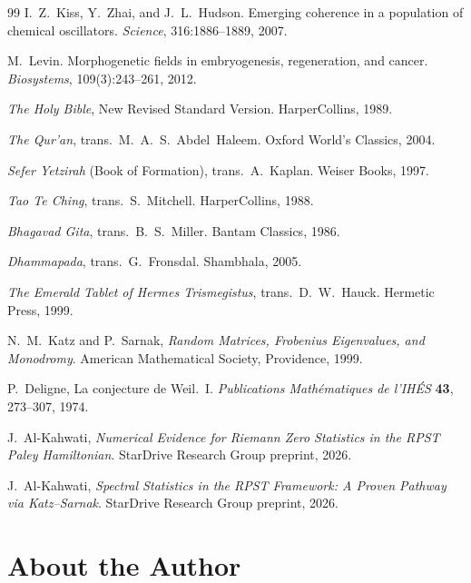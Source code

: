 \documentclass[12pt,oneside]{book}
\theoremstyle{definition}
\begin{document}
\begin{thebibliography}{99}
  I.~Z.~Kiss, Y.~Zhai, and J.~L.~Hudson. Emerging coherence in a population of
  chemical oscillators. \textit{Science}, 316:1886--1889, 2007.

  M.~Levin. Morphogenetic fields in embryogenesis, regeneration, and cancer.
  \textit{Biosystems}, 109(3):243--261, 2012.

  \textit{The Holy Bible}, New Revised Standard Version. HarperCollins, 1989.

  \textit{The Qur'an}, trans.\ M.~A.~S.~Abdel~Haleem. Oxford World's Classics, 2004.

  \textit{Sefer Yetzirah} (Book of Formation), trans.\ A.~Kaplan.
  Weiser Books, 1997.

  \textit{Tao Te Ching}, trans.\ S.~Mitchell. HarperCollins, 1988.

  \textit{Bhagavad Gita}, trans.\ B.~S.~Miller. Bantam Classics, 1986.

  \textit{Dhammapada}, trans.\ G.~Fronsdal. Shambhala, 2005.

  \textit{The Emerald Tablet of Hermes Trismegistus}, trans.\ D.~W.~Hauck.
  Hermetic Press, 1999.

  N.~M.~Katz and P.~Sarnak,
  \textit{Random Matrices, Frobenius Eigenvalues, and Monodromy}.
  American Mathematical Society, Providence, 1999.

  P.~Deligne,
  La conjecture de Weil.~I.
  \textit{Publications Mathématiques de l'IHÉS} \textbf{43}, 273--307, 1974.

  J.~Al-Kahwati,
  \textit{Numerical Evidence for Riemann Zero Statistics in the RPST Paley
  Hamiltonian}.
  StarDrive Research Group preprint, 2026.

  J.~Al-Kahwati,
  \textit{Spectral Statistics in the RPST Framework: A Proven Pathway via
  Katz--Sarnak}.
  StarDrive Research Group preprint, 2026.

\end{thebibliography}

\backmatter

\chapter*{About the Author}
\end{document}
